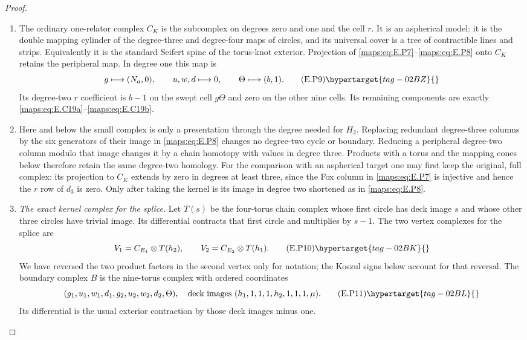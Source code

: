 \begin{proof}
\begin{enumerate}[label={$\langle1\rangle$\arabic*.},leftmargin=*]
\item The ordinary one-relator complex $C_K$ is the subcomplex
on degrees zero and one and the cell $r$. It is an
aspherical model: it is the double mapping cylinder
of the degree-three and degree-four maps of circles,
and its universal cover is a tree of contractible
lines and strips. Equivalently it is the standard
Seifert spine of the torus-knot exterior. Projection
of \eqref{maps:eq:E.P7}--\eqref{maps:eq:E.P8} onto $C_K$ retains the peripheral map. In degree one this map is
\[
 g\longmapsto(N_a,0),\qquad
 u,w,d\longmapsto0,\qquad
 \Theta\longmapsto(b,1).
 \tag{E.P9}\hypertarget{tag-02BZ}{}\label{maps:eq:E.P9}
\]
Its degree-two $r$ coefficient is $b-1$ on the swept
cell $g\Theta$ and zero on the other nine cells.
Its remaining components are exactly \eqref{maps:eq:E.C19a}--\eqref{maps:eq:E.C19b}.
\item Here and below the small complex is only a
presentation through the degree needed for $H_2$.
Replacing redundant degree-three columns by the six
generators of their image in \eqref{maps:eq:E.P8} changes no
degree-two cycle or boundary. Reducing a peripheral
degree-two column modulo that image changes it by
a chain homotopy with values in degree three.
Products with a torus and the mapping cones below
therefore retain the same degree-two homology.
For the comparison with an aspherical target one
may first keep the original, full complex: its
projection to $C_K$ extends by zero in degrees at
least three, since the Fox column in \eqref{maps:eq:E.P7} is
injective and hence the $r$ row of $d_3$ is zero.
Only after taking the kernel is its image in degree
two shortened as in \eqref{maps:eq:E.P8}. 

\item \emph{The exact kernel complex for the splice.}
Let $T(s)$ be the four-torus chain complex whose
first circle has deck image $s$ and whose other
three circles have trivial image. Its differential
contracts that first circle and multiplies by $s-1$.
The two vertex complexes for the splice are
\[
 V_1=C_{E_1}\otimes T(h_2),\qquad
 V_2=C_{E_2}\otimes T(h_1).
 \tag{E.P10}\hypertarget{tag-02BK}{}\label{maps:eq:E.P10}
\]
We have reversed the two product factors in the
second vertex only for notation; the Koszul signs
below account for that reversal. The boundary
complex $B$ is the nine-torus complex with ordered
coordinates
\[
 (g_1,u_1,w_1,d_1,g_2,u_2,w_2,d_2,\Theta),
 \quad\text{deck images }(h_1,1,1,1,h_2,1,1,1,\mu).
 \tag{E.P11}\hypertarget{tag-02BL}{}\label{maps:eq:E.P11}
\]
Its differential is the usual exterior contraction
by those deck images minus one.


\end{enumerate}
\end{proof}
